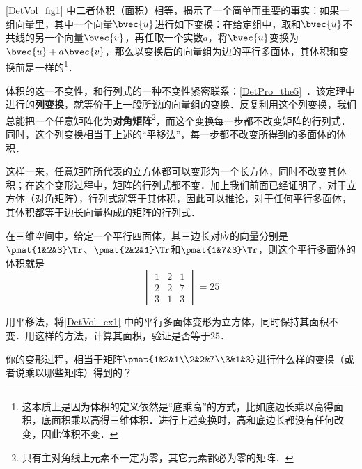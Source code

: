 \autoref{DetVol_fig1} 中二者体积（面积）相等，揭示了一个简单而重要的事实：如果一组向量里，其中一个向量$\bvec{u}$进行如下变换：在给定组中，取和$\bvec{u}$不共线的另一个向量$\bvec{v}$，再任取一个实数$a$，将$\bvec{u}$变换为$\bvec{u}+a\bvec{v}$，那么以变换后的向量组为边的平行多面体，其体积和变换前是一样的\footnote{这本质上是因为体积的定义依然是“底乘高”的方式，比如底边长乘以高得面积，底面积乘以高得三维体积．进行上述变换时，高和底边长都没有任何改变，因此体积不变．}．

体积的这一不变性，和行列式的一种不变性紧密联系：\autoref{DetPro_the5}~．该定理中进行的\textbf{列变换}，就等价于上一段所说的向量组的变换．反复利用这个列变换，我们总能把一个任意矩阵化为\textbf{对角矩阵}\footnote{只有主对角线上元素不一定为零，其它元素都必为零的矩阵．}，而这个变换每一步都不改变矩阵的行列式．同时，这个列变换相当于上述的“平移法”，每一步都不改变所得到的多面体的体积．

这样一来，任意矩阵所代表的立方体都可以变形为一个长方体，同时不改变其体积；在这个变形过程中，矩阵的行列式都不变．加上我们前面已经证明了，对于立方体（对角矩阵），行列式就等于其体积，因此可以推论，对于任何平行多面体，其体积都等于边长向量构成的矩阵的行列式．

\begin{example}{}\label{DetVol_ex1}
在三维空间中，给定一个平行四面体，其三边长对应的向量分别是$\pmat{1&2&3}\Tr$、$\pmat{2&2&1}\Tr$和$\pmat{1&7&3}\Tr$，则这个平行多面体的体积就是
\begin{equation}
\begin{vmatrix}
1&2&1\\
2&2&7\\
3&1&3
\end{vmatrix} = 25
\end{equation}
\end{example}

\begin{exercise}{}
用平移法，将\autoref{DetVol_ex1} 中的平行多面体变形为立方体，同时保持其面积不变．用这样的方法，计算其面积，验证是否等于$25$．

你的变形过程，相当于矩阵$\pmat{1&2&1\\2&2&7\\3&1&3}$进行什么样的变换（或者说乘以哪些矩阵）得到的？
\end{exercise}







